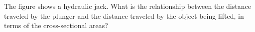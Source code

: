         The figure shows a hydraulic jack. What is the relationship between the
        distance traveled by the plunger and the distance traveled by
        the object being lifted, in terms of the cross-sectional areas?
